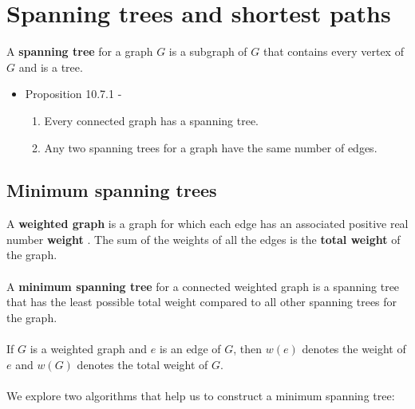 \documentclass[a4paper]{article}
\begin{document}
\section{Spanning trees and shortest paths}
A \textbf{spanning tree} for a graph $G$ is a subgraph of $G$ that contains every vertex of $G$ and is a tree.
\begin{itemize}
	\item[] Proposition 10.7.1 - 
	\begin{enumerate}
		\item Every connected graph has a spanning tree.
		\item Any two spanning trees for a graph have the same number of edges.
	\end{enumerate}
\end{itemize}

\subsection{Minimum spanning trees}
A \textbf{weighted graph} is a graph for which each edge has an associated positive real number \textbf{weight} . The sum of the weights of all the edges is the \textbf{total weight} of the graph.\\\\
A \textbf{minimum spanning tree} for a connected weighted graph is a spanning tree that has the least possible total weight compared to all other spanning trees for the graph.\\\\
If $G$ is a weighted graph and $e$ is an edge of $G$, then $w(e)$ denotes the weight of $e$ and $w(G)$ denotes the total weight of $G$.\\\\
We explore two algorithms that help us to construct a minimum spanning tree:
\end{document}
